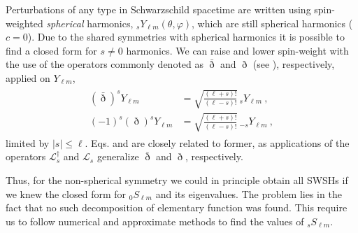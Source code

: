 Perturbations of any type in Schwarzschild spacetime are written using spin-weighted \emph{spherical} harmonics, ${}_{s}Y_{\ell m}(\theta,\varphi)$, which are still spherical harmonics ($c=0$).
Due to the shared symmetries with spherical harmonics it is possible to find a closed form for $s\ne0$ harmonics.
We can raise and lower spin-weight with the use of the operators commonly denoted as $\bar{\eth}$ and $\eth$ (see ), respectively, applied on $Y_{\ell m}$,
\begin{align}
    \begin{split}
        (\bar{\eth})^s Y_{\ell m} &= \sqrt{\frac{(\ell+s)!}{(\ell-s)!}} \,{}_{s}Y_{\ell m}  ~, \\
        (-1)^s  (\eth)^s Y_{\ell m} &= \sqrt{\frac{(\ell+s)!}{(\ell-s)!}} \,{}_{-s}Y_{\ell m} ~,
    \end{split}
\end{align}
limited by $|s|\le\ell$.
Eqs.  and  are closely related to former, as applications of the operators $\mathscr{L}^\dagger_s$ and $\mathscr{L}_s$ generalize $\bar{\eth}$ and $\eth$, respectively.

Thus, for the non-spherical symmetry we could in principle obtain all SWSHs if we knew the closed form for ${}_{0}S_{\ell m}$ and its eigenvalues. The problem lies in the fact that no such decomposition of elementary function was found. This require us to follow numerical and approximate methods to find the values of ${}_{s}S_{\ell m}$.

